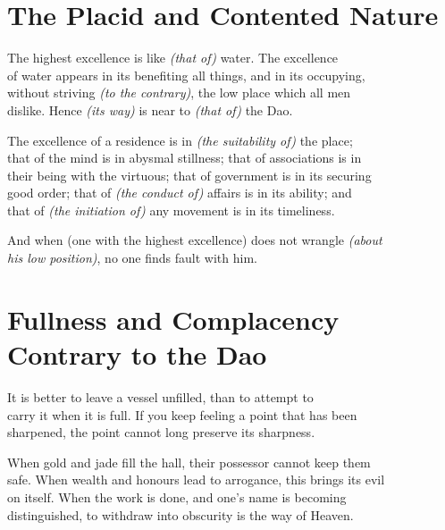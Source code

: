 \section*{The Placid and Contented Nature}
    The highest excellence is like \textit{(that of)} water. The excellence\\
    of water appears in its benefiting all things, and in its occupying,\\
    without striving \textit{(to the contrary)}, the low place which all men\\
    dislike. Hence \textit{(its way)} is near to \textit{(that of)} the Dao.\vspace{\baselineskip}
    
    The excellence of a residence is in \textit{(the suitability of)} the place;\\
    that of the mind is in abysmal stillness; that of associations is in\\
    their being with the virtuous; that of government is in its securing\\
    good order; that of \textit{(the conduct of)} affairs is in its ability; and\\
    that of \textit{(the initiation of)} any movement is in its timeliness.\vspace{\baselineskip}

And when (one with the highest excellence) does not wrangle \textit{(about\\
his low position)}, no one finds fault with him.\vspace{\baselineskip}

\section*{Fullness and Complacency Contrary to the Dao}
    It is better to leave a vessel unfilled, than to attempt to\\
    carry it when it is full. If you keep feeling a point that has been\\
    sharpened, the point cannot long preserve its sharpness.\vspace{\baselineskip}
    
    When gold and jade fill the hall, their possessor cannot keep them\\
    safe. When wealth and honours lead to arrogance, this brings its evil\\
    on itself. When the work is done, and one's name is becoming\\
    distinguished, to withdraw into obscurity is the way of Heaven.\vspace{\baselineskip}
    
